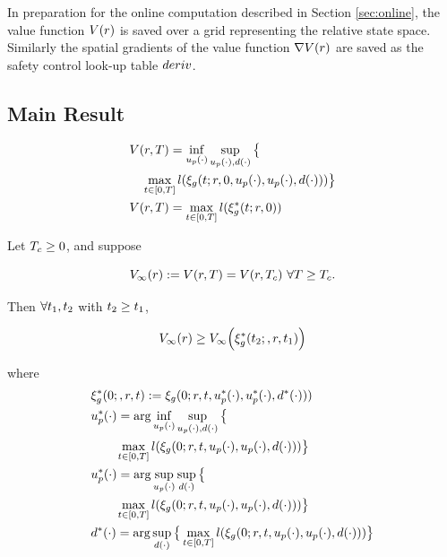  In preparation for the online computation described in Section \ref{sec:online}, the value function $V(r)$ is saved over a grid representing the relative state space. Similarly the spatial gradients of the value function $\nabla V(r)$ are saved as the safety control look-up table $deriv$.
 
\subsection{Main Result}
 \begin{equation}
 \begin{aligned}
& V(r, T) = \inf_{u_p(\cdot)} \sup_{u_p(\cdot), d(\cdot)} \big\{\\
&\quad \max_{t \in [0, T]} l(\xi_g(t; r, 0, u_p(\cdot), u_p(\cdot), d(\cdot)))\big\} \\
& V(r, T) = \max_{t \in [0, T]} l(\xi_g^*(t; r, 0)) 
 \end{aligned}
  \end{equation}
 
 \begin{claim}
   \label{thm:main}
   Let $T_c \ge 0$, and suppose
   
   \begin{equation}
   \label{eq:conv_valfunc}
   V_\infty(r) := V(r, T) = V(r, T_c) ~ \forall T \ge T_c.
   \end{equation}
   
   Then $\forall t_1, t_2$ with $t_2 \ge t_1$,
   
   \begin{equation}
   \label{eq:invariant}
   V_\infty(r) \ge V_\infty\Big(\xi_g^*(t_2;, r, t_1)\Big)
   \end{equation}
   
   \noindent where
   \begin{equation}
   \begin{aligned}
   & \xi_g^*(0;, r, t) := \xi_g(0; r, t, u_p^*(\cdot), u_p^*(\cdot), d^*(\cdot))) \\
   & u_p^*(\cdot) = \arg \inf_{u_p(\cdot)} \sup_{u_p(\cdot), d(\cdot)}\big\{ \\
   & \qquad \max_{t \in [0, T]} l(\xi_g(0; r, t, u_p(\cdot), u_p(\cdot), d(\cdot))) \big\}\\
   & u_p^*(\cdot) = \arg \sup_{u_p(\cdot)} \sup_{d(\cdot)} \big\{ \\
   & \qquad \max_{t \in [0, T]} l(\xi_g(0; r, t, u_p(\cdot), u_p(\cdot), d(\cdot))) \big\} \\
   & d^*(\cdot) = \arg \sup_{d(\cdot)} \big\{\max_{t \in [0, T]} l(\xi_g(0; r, t, u_p(\cdot), u_p(\cdot),  d(\cdot))) \big\}
   \end{aligned}
   \end{equation}
   
 \end{claim}
 
